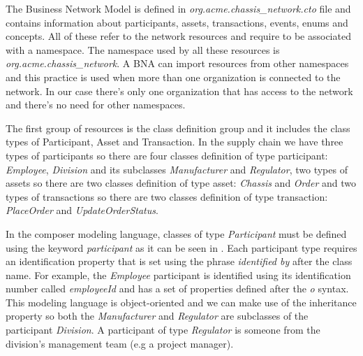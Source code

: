 
The Business Network Model is defined in \emph{org.acme.chassis_network.cto} file and contains information about participants, assets, transactions, events, enums and concepts. All of these refer to the network resources and require to be associated with a namespace. The namespace used by all these resources is \emph{org.acme.chassis_network}. A BNA can import resources from other namespaces and this practice is used when more than one organization is connected to the network. In our case there's only one organization that has access to the network and there's no need for other namespaces.

The first group of resources is the class definition group and it includes the class types of Participant, Asset and Transaction. In the supply chain we have three types of participants so there are four classes definition of type participant: \emph{Employee}, \emph{Division} and its subclasses \emph{Manufacturer} and \emph{Regulator}, two types of assets so there are two classes definition of type asset: \emph{Chassis} and \emph{Order} and two types of transactions so there are two classes definition of type transaction: \emph{PlaceOrder} and \emph{UpdateOrderStatus}. 

In the composer modeling language, classes of type \emph{Participant} must be defined using the keyword \emph{participant} as it can be seen in . Each participant type requires an identification property that is set using the phrase \emph{identified by} after the class name. For example, the \emph{Employee} participant is identified using its identification number called \emph{employeeId} and has a set of properties defined after the \emph{o } syntax. This modeling language is object-oriented and we can make use of the inheritance property so both the \emph{Manufacturer} and \emph{Regulator} are subclasses of the participant \emph{Division}. A participant of type \emph{Regulator} is someone from the division's management team (e.g a project manager).


